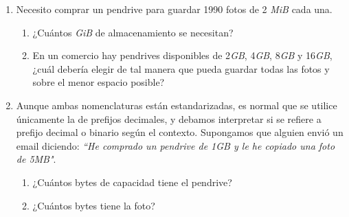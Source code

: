 \documentclass[12pt]{article}
\begin{document}
\begin{enumerate}

    \item Necesito comprar un pendrive para guardar 1990 fotos de 2 \emph{MiB}
        cada una.

        \begin{enumerate}

            \item ¿Cuántos \emph{GiB} de almacenamiento se necesitan?

            \item En un comercio hay pendrives disponibles de 2\emph{GB},
                4\emph{GB}, 8\emph{GB} y 16\emph{GB}, ¿cuál debería elegir de
                tal manera que pueda guardar todas las fotos y sobre el menor
                espacio posible?

        \end{enumerate}

    \item Aunque ambas nomenclaturas están estandarizadas, es normal que se
        utilice únicamente la de prefijos decimales, y debamos interpretar si
            se refiere a prefijo decimal o binario según el contexto.
            Supongamos que alguien envió un email diciendo: \emph{``He
            comprado un pendrive de 1GB y le he copiado una foto de 5MB"}.

        \begin{enumerate}

            \item ¿Cuántos bytes de capacidad tiene el pendrive?

            \item ¿Cuántos bytes tiene la foto?

        \end{enumerate}

\end{enumerate}

\clearpage
\end{document}
